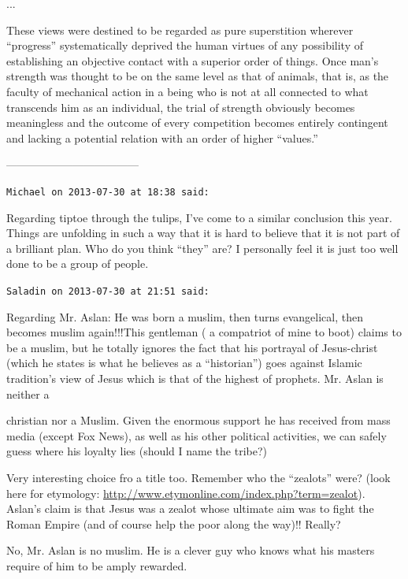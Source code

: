 \begin{footnotesize}
\begin{sffamily}
... 

These views were destined to be regarded as pure superstition wherever ``progress'' systematically deprived the human virtues of any possibility of establishing an objective contact with a superior order of things. Once man's strength was thought to be on the same level as that of animals, that is, as the faculty of mechanical action in a being who is not at all connected to what transcends him as an individual, the trial of strength obviously becomes meaningless and the outcome of every competition becomes entirely contingent and lacking a potential relation with an order of higher ``values.''

------------------------------------

\hfill

\texttt{Michael on 2013-07-30 at 18:38 said:}

Regarding tiptoe through the tulips, I've come to a similar conclusion this year. Things are unfolding in such a way that it is hard to believe that it is not part of a brilliant plan. Who do you think ``they'' are? I personally feel it is just too well done to be a group of people.

\hfill

\texttt{Saladin on 2013-07-30 at 21:51 said:}

Regarding Mr. Aslan: He was born a muslim, then turns evangelical, then becomes muslim again!!!This gentleman ( a compatriot of mine to boot) claims to be a muslim, but he totally ignores the fact that his portrayal of Jesus-christ (which he states is what he believes as a ``historian'') goes against Islamic tradition's view of Jesus which is that of the highest of prophets. Mr. Aslan is neither a

christian nor a Muslim. Given the enormous support he has received from mass media (except Fox News), as well as his other political activities, we can safely guess where his loyalty lies (should I name the tribe?)

Very interesting choice fro a title too. Remember who the ``zealots'' were? (look here for etymology:
\url{http://www.etymonline.com/index.php?term=zealot}). Aslan's claim is that Jesus was a zealot whose ultimate aim was to fight the Roman Empire (and of course help the poor along the way)!! Really?

No, Mr. Aslan is no muslim. He is a clever guy who knows what his masters require of him to be amply rewarded.

\hfill


\end{sffamily}
\end{footnotesize}
